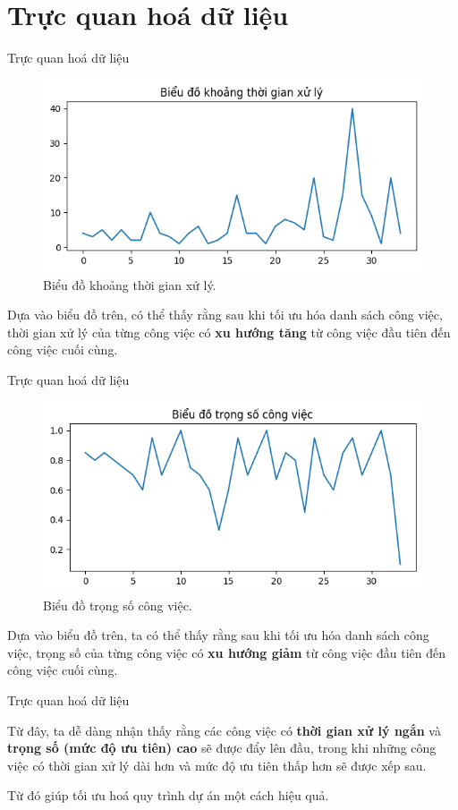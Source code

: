 \documentclass[10pt]{beamer}
\begin{document}
\section*{Trực quan hoá dữ liệu}

\begin{frame}{Trực quan hoá dữ liệu}
\begin{figure}[h]
\centering
\includegraphics[width=0.7\linewidth]{output_project_p.png}
\caption{Biểu đồ khoảng thời gian xử lý.}
\end{figure}

Dựa vào biểu đồ trên, có thể thấy rằng sau khi tối ưu hóa danh sách công việc, thời gian xử lý của từng công việc có \textbf{xu hướng tăng} từ công việc đầu tiên đến công việc cuối cùng.
\end{frame}

\begin{frame}{Trực quan hoá dữ liệu}
\begin{figure}[h]
\centering
\includegraphics[width=0.7\linewidth]{output_project_w.png}
\caption{Biểu đồ trọng số công việc.}
\end{figure}

Dựa vào biểu đồ trên, ta có thể thấy rằng sau khi tối ưu hóa danh sách công việc, trọng số của từng công việc có \textbf{xu hướng giảm} từ công việc đầu tiên đến công việc cuối cùng.
\end{frame}

\begin{frame}{Trực quan hoá dữ liệu}

Từ đây, ta dễ dàng nhận thấy rằng các công việc có \textbf{thời gian xử lý ngắn} và \textbf{trọng số (mức độ ưu tiên) cao} sẽ được đẩy lên đầu, trong khi những công việc có thời gian xử lý dài hơn và mức độ ưu tiên thấp hơn sẽ được xếp sau.

Từ đó giúp tối ưu hoá quy trình dự án một cách hiệu quả.
\end{frame}



\begin{frame}
    \nocite{*}
    \printbibliography
\end{frame}


\begin{frame}
    \begin{block}{}
    \medskip
    \center{\huge \it \textcolor[rgb]{0.37, 0.150, 0.190}{Thanks for listening!}}
    \medskip
    \end{block}	
\end{frame}    
\end{document}
